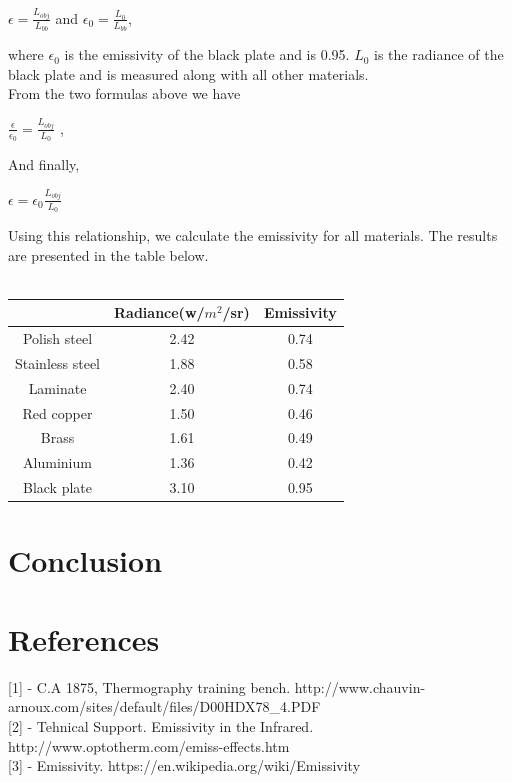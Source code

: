 \documentclass[english]{article}
\begin{document}
\begin{center}
$\epsilon = \frac{L_{obj}}{L_{bb}} $ and $\epsilon_{0} = \frac{L_{0}}{L_{bb}} $,
\end{center}
where $\epsilon_{0}$ is the emissivity of the black plate and is 0.95. $L_{0}$ is the radiance of the black plate and is measured along with all other materials.\\
From the two formulas above we have\\
\begin{center}
$\frac{\epsilon}{\epsilon_{0}} = \frac{L_{obj}}{L_{0}} $ ,
\end{center}
And finally,\\
\begin{center}
$\epsilon = \epsilon_{0} \frac{L_{obj}}{L_{0}} $

\end{center}
Using this relationship, we calculate the emissivity for all materials. 
The results are presented in the table below.\\
\\
\begin{center}
\begin{tabular}{|c|c|c|}
\hline 
 & Radiance(w/$m^{2}$/sr) & Emissivity\tabularnewline
\hline 
\hline 
Polish steel & 2.42 & 0.74\tabularnewline
\hline 
Stainless steel & 1.88 & 0.58\tabularnewline
\hline 
Laminate & 2.40 & 0.74\tabularnewline
\hline 
Red copper & 1.50 & 0.46\tabularnewline
\hline 
Brass & 1.61 & 0.49\tabularnewline
\hline 
Aluminium & 1.36 & 0.42\tabularnewline
\hline 
Black plate & 3.10 & 0.95\tabularnewline
\hline 
\end{tabular}
\end{center}

\section{Conclusion}
\section{References}
{[}1{]} - C.A 1875, Thermography training bench. http://www.chauvin-arnoux.com/sites/default/files/D00HDX78\_4.PDF\\
{[}2{]} - Tehnical Support. Emissivity in the Infrared. http://www.optotherm.com/emiss-effects.htm\\
{[}3{]} - Emissivity. https://en.wikipedia.org/wiki/Emissivity
\end{document}
